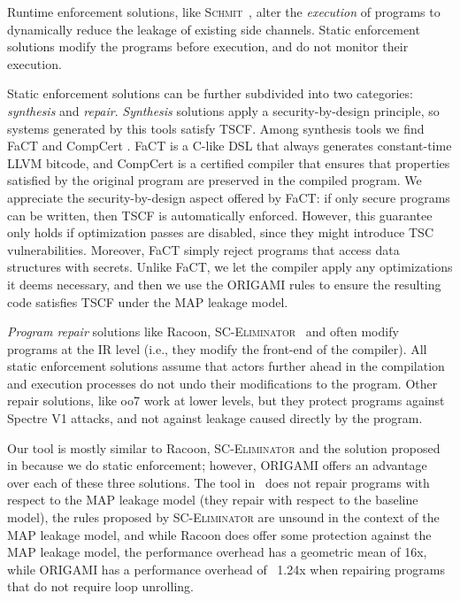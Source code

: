 {Runtime enforcement solutions, like \textsc{Schmit}~\cite{Schmit}, alter the \emph{execution} of programs to dynamically reduce the leakage of existing side channels. Static enforcement solutions modify the programs before execution, and do not monitor their execution.

Static enforcement solutions can be further subdivided into two categories: \emph{synthesis} and \emph{repair}. \emph{Synthesis} solutions apply a security-by-design principle, so systems generated by this tools satisfy TSCF. Among synthesis tools we find FaCT \cite{FaCT} and CompCert \cite{CompCert}. 
FaCT is a C-like DSL that always generates constant-time LLVM bitcode, and CompCert is a certified compiler that ensures that properties satisfied by the original program are preserved in the compiled program. We appreciate the security-by-design aspect offered by FaCT: if only secure programs can be written, then TSCF is automatically enforced. However, this guarantee only holds if optimization passes are disabled, since they might introduce TSC vulnerabilities. Moreover, FaCT simply reject programs that access data structures with secrets. Unlike FaCT, we let the compiler apply any optimizations it deems necessary, and then we use the ORIGAMI rules to ensure the resulting code satisfies TSCF under the MAP leakage model. 

\emph{Program repair} solutions like Racoon\cite{Racoon}, \textsc{SC-Eliminator}~\cite{SCEliminator} and \cite{MSESC} often modify programs at the IR level (i.e., they modify the front-end of the compiler). All static enforcement solutions assume that actors further ahead in the compilation and execution processes do not undo their modifications to the program. Other repair solutions, like oo7 \cite{oo7} work at lower levels, but they protect programs against Spectre V1 attacks, and not against leakage caused directly by the program.

Our tool is mostly similar to Racoon, \textsc{SC-Eliminator} and the solution proposed in \cite{MSESC} because we do static enforcement; however, ORIGAMI offers an advantage over each of these three solutions. The tool in~\cite{MSESC} does not repair programs with respect to the MAP leakage model (they repair with respect to the baseline model), the rules proposed by \textsc{SC-Eliminator} are unsound in the context of the MAP leakage model, and while Racoon does offer some protection against the MAP leakage model, the performance overhead has a geometric mean of 16x, while ORIGAMI has a performance overhead of ~1.24x when repairing programs that do not require loop unrolling. 

}
